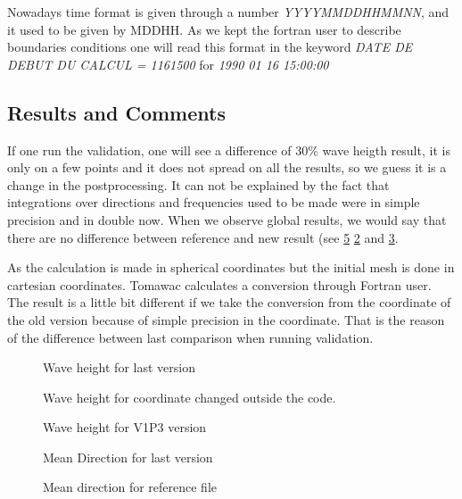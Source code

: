 Nowadays time format is given through a number \textit{YYYYMMDDHHMMNN}, and it used to be given by MDDHH. 
As we kept the fortran user to describe boundaries conditions one will read this format in the keyword \textit{DATE DE DEBUT DU CALCUL = 1161500} for \textit{1990 01 16 15:00:00}

\subsection{Results and Comments}

If one run the validation, one will see a difference of 30\% wave heigth result, it is only on a few points and it does not spread on all the results, so we guess it is a change in the postprocessing. It can not be explained by the fact that integrations over directions and frequencies used to be made were in simple precision and in double now.
When we observe global results, we would say that there are no difference between reference and new result (see \ref{figmanchehm0} \ref{figmanchehm02} and \ref{figmanchehm0v1P3}.

As the calculation is made in spherical coordinates but the initial mesh is done in cartesian coordinates. Tomawac calculates a conversion through Fortran user. The result is a little bit different if we take the conversion from the coordinate of the old version because of simple precision in the coordinate. That is the reason of the difference between last comparison when running validation.  

\begin{figure} [!h]
\centering
{}
 \caption{Wave height for last version}
\label{figmanchehm0}
\end{figure}
\begin{figure} [!h]
\centering
{}
 \caption{Wave height for coordinate changed outside the code.}
\label{figmanchehm02}
\end{figure}
\begin{figure} [!h]
\centering
{}
 \caption{Wave height for V1P3 version}
\label{figmanchehm0v1P3}
\end{figure}
\begin{figure} [!h]
\centering
{}
 \caption{Mean Direction for last version}
\label{figmanchedirection}
\end{figure}
\begin{figure} [!h]
\centering
{}
 \caption{Mean direction for reference file}
\label{figmanchehm0}
\end{figure}
